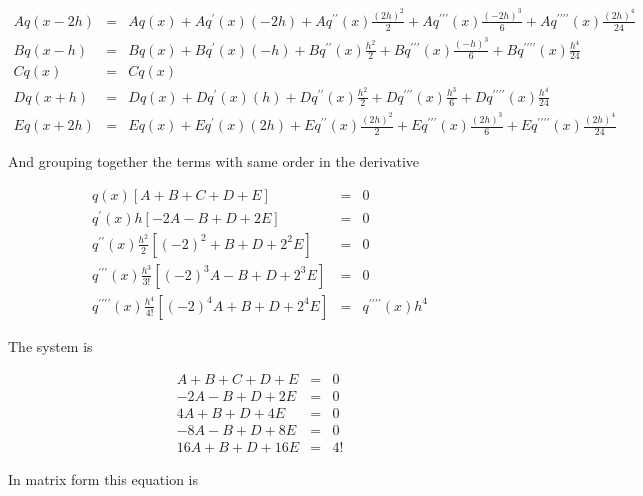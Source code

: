 \begin{eqnarray}
Aq(x-2h) &=& Aq(x) + Aq^\prime(x)(-2h) + Aq^{\prime\prime}(x)\frac{(2h)^2}{2}  + Aq^{\prime\prime\prime}(x)\frac{(-2h)^3}{6}+ Aq^{\prime\prime\prime\prime}(x)\frac{(2h)^4}{24}\nonumber\\
Bq(x-h) &=& Bq(x) + Bq^\prime(x)(-h) + Bq^{\prime\prime}(x)\frac{h^2}{2}  + Bq^{\prime\prime\prime}(x)\frac{(-h)^3}{6}+ Bq^{\prime\prime\prime\prime}(x)\frac{h^4}{24}\nonumber\\
Cq(x) &=& Cq(x) \\
Dq(x+h) &=& Dq(x) + Dq^\prime(x)(h) + Dq^{\prime\prime}(x)\frac{h^2}{2}  + Dq^{\prime\prime\prime}(x)\frac{h^3}{6}+ Dq^{\prime\prime\prime\prime}(x)\frac{h^4}{24}\nonumber\\
Eq(x+2h) &=& Eq(x) + Eq^\prime(x)(2h) + Eq^{\prime\prime}(x)\frac{(2h)^2}{2}  + Eq^{\prime\prime\prime}(x)\frac{(2h)^3}{6}+ Eq^{\prime\prime\prime\prime}(x)\frac{(2h)^4}{24}\nonumber
\end{eqnarray}

And grouping together the terms with same order in the derivative

\begin{eqnarray}
q(x)[A+B+C+D+E] &=& 0\\
q^\prime(x)h[-2A-B+D+2E] &=& 0\\
q^{\prime\prime}(x)\frac{h^2}{2}[(-2)^2+B +D+2^2E] &=& 0\\
q^{\prime\prime\prime}(x)\frac{h^3}{3!}[(-2)^3A-B +D+2^3E]&=&0\\
q^{\prime\prime\prime\prime}(x)\frac{h^4}{4!}[(-2)^4A+B +D+2^4E]&=&q^{\prime\prime\prime\prime}(x)h^4
\end{eqnarray}

The system  is 

\begin{eqnarray}
A+B+C+D+E &=& 0 \\
-2A-B+D+2E &=& 0 \\
4A+B +D+4E &=& 0 \\
-8A-B +D+8E &=&0 \\
16A+B +D+16E &=&4!
\end{eqnarray}


In matrix form this equation is 

